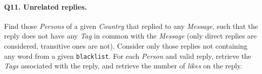 \paragraph{\textbf{Q11}. Unrelated replies.}
Find those \emph{Persons} of a given \emph{Country} that replied to any
\emph{Message}, such that the reply does not have any \emph{Tag} in
common with the \emph{Message} (only direct replies are considered,
transitive ones are not). Consider only those replies not containing any
word from a given \texttt{blacklist}. For each \emph{Person} and valid
reply, retrieve the \emph{Tags} associated with the reply, and retrieve
the number of \emph{likes} on the reply.
